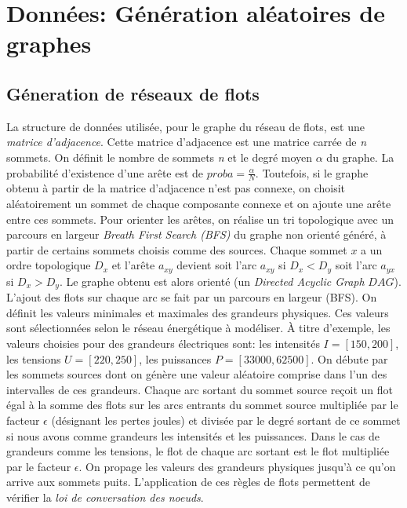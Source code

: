 \documentclass[onecolumn, 12pt]{book}
\begin{document}
\section{Donn\'ees: G\'en\'eration al\'eatoires de graphes} 
\subsection{G\'eneration de r\'eseaux de flots}
La structure de donn\'ees utilis\'ee, pour le graphe du r\'eseau de flots, est une {\em matrice d'adjacence}.
Cette matrice d'adjacence est une matrice carr\'ee de {\em n} sommets.
On d\'efinit le nombre de sommets {\em n} et le degr\'e moyen  $\alpha$ du graphe. 
La probabilit\'e d'existence d'une ar\^ete est de $proba = \frac{\alpha}{N}$.
Toutefois, si le graphe obtenu \`a partir de la matrice d'adjacence n'est pas connexe, on choisit al\'eatoirement un sommet de chaque composante connexe et on ajoute une ar\^ete entre ces sommets.
\newline
Pour orienter les ar\^etes, on r\'ealise un tri topologique avec un parcours en largeur {\em Breath First Search (BFS)} du graphe non orient\'e g\'en\'er\'e, \`a partir de certains sommets choisis comme des sources. 
Chaque sommet $x$ a un ordre topologique $D_x$ et l'ar\^ete $a_{xy}$ devient soit l'arc $a_{xy}$ si $D_x < D_y$ soit l'arc $a_{yx}$ si $D_x > D_y$. 
Le graphe obtenu est alors orient\'e (un {\em Directed Acyclic Graph} $DAG$).
\newline
L'ajout des flots sur chaque arc se fait par un parcours en largeur (BFS).
On d\'efinit les valeurs minimales et maximales des grandeurs physiques. 
Ces valeurs sont s\'electionn\'ees selon le r\'eseau \'energ\'etique \`a mod\'eliser. 
\`A titre d'exemple, les valeurs choisies pour des grandeurs \'electriques sont: les intensit\'es $I = [150, 200 ]$, les tensions $U = [220, 250]$, les puissances $P = [ 33000, 62500]$. \newline
On d\'ebute par les sommets sources dont on g\'en\`ere une valeur al\'eatoire comprise dans l'un des intervalles de ces grandeurs. 
Chaque arc sortant du sommet source re\c coit  un flot \'egal \`a la somme des flots sur les arcs entrants du sommet source multipli\'ee par le facteur $\epsilon$ (d\'esignant les pertes joules) et divis\'ee par le degr\'e sortant de ce sommet si nous avons comme grandeurs les intensit\'es et les puissances.
Dans le cas de grandeurs comme les tensions, le flot de chaque arc sortant est le flot multipli\'ee par le facteur $\epsilon$. 
On propage les valeurs des grandeurs physiques jusqu'\`a ce qu'on arrive aux sommets puits.
L'application de ces r\`egles de flots permettent de v\'erifier la {\em loi de conversation des noeuds}.
\end{document}
